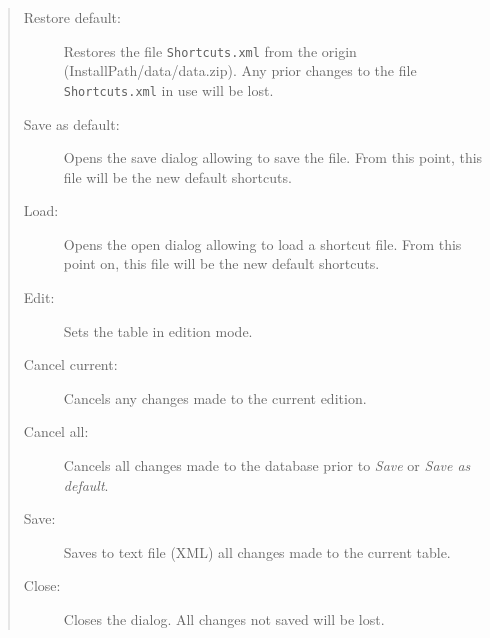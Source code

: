 \begin{quote}
  \begin{footnotesize}
    \begin{description}
      \item[Restore default:]
        Restores the file \texttt{Shortcuts.xml} from the origin
        (InstallPath/data/data.zip). Any prior changes to the file
        \texttt{Shortcuts.xml} in use will be lost.
      \item[Save as default:]
        Opens the save dialog allowing to save the file. From this
        point, this file will be the new default shortcuts.
      \item[Load:]
        Opens the open dialog allowing to load a shortcut file. From this
        point on, this file will be the new default shortcuts.
      \item[Edit:]
        Sets the table in edition mode.
      \item[Cancel current:]
        Cancels any changes made to the current edition.
      \item[Cancel all:]
        Cancels all changes made to the database prior to \textit{Save}
        or \textit{Save as default}.
      \item[Save:]
        Saves to text file (XML) all changes made to the current table.
      \item[Close:]
        Closes the dialog. All changes not saved will be lost.
    \end{description}
  \end{footnotesize}
\end{quote}

